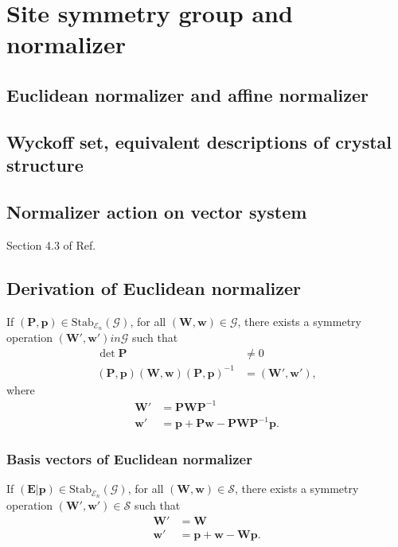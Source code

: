 \section{\label{sec:normalizer}Site symmetry group and normalizer}

\subsection{Euclidean normalizer and affine normalizer}


\subsection{Wyckoff set, equivalent descriptions of crystal structure}

\subsection{Normalizer action on vector system}

Section 4.3 of Ref.~\cite{Souvignier08}

\subsection{Derivation of Euclidean normalizer}

If $( \bm{P}, \bm{p} ) \in \mathrm{Stab}_{\mathcal{E}_{n}}(\mathcal{G})$, for all $(\bm{W}, \bm{w}) \in \mathcal{G}$, there exists a symmetry operation $(\bm{W}', \bm{w}') in \mathcal{G}$ such that
\begin{align}
    \det \bm{P} &\neq 0 \\
    (\bm{P}, \bm{p}) (\bm{W}, \bm{w}) (\bm{P}, \bm{p})^{-1} &= (\bm{W}', \bm{w}'),
\end{align}
where
\begin{align}
  \bm{W}' &= \bm{P} \bm{W} \bm{P}^{-1} \\
  \bm{w}' &= \bm{p} + \bm{Pw} - \bm{PW}\bm{P}^{-1}\bm{p}.
\end{align}

\subsubsection{Basis vectors of Euclidean normalizer}

If $( \bm{E} | \bm{p} ) \in \mathrm{Stab}_{\mathcal{E}_{n}}(\mathcal{G}) $, for all $(\bm{W}, \bm{w} ) \in \mathcal{S}$, there exists a symmetry operation $(\bm{W}', \bm{w}' ) \in \mathcal{S}$ such that
\begin{align}
  \bm{W}' &= \bm{W} \\
  \bm{w}' &= \bm{p} + \bm{w} - \bm{Wp}.
\end{align}

